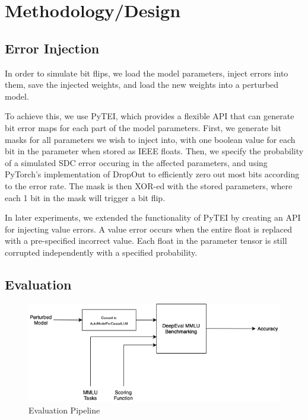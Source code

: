\section{Methodology/Design}
\label{sec:methodology}

\subsection{Error Injection}
In order to simulate bit flips, we load the model parameters, inject errors into them, save the injected weights,
and load the new weights into a perturbed model. 

To achieve this, we use PyTEI, which provides a flexible API that can generate bit error maps for each part of the model parameters. 
First, we generate bit masks for all parameters we wish to inject into, with one boolean value for each bit in the parameter when stored as IEEE floats.
Then, we specify the probability of a simulated SDC error occuring in the affected parameters, and using PyTorch's implementation of DropOut to efficiently
zero out most bits according to the error rate. The mask is then XOR-ed with the stored parameters, where each 1 bit in the mask will trigger a bit flip.

In later experiments, we extended the functionality of PyTEI by creating an API for injecting value errors. A value error occurs when the entire float is replaced with a pre-specified incorrect value. 
Each float in the parameter tensor is still corrupted independently with a specified probability. 

\subsection{Evaluation}
\begin{figure}
    \centering
    \includegraphics[width=1.0\linewidth]{images/evaluation-pipeline.png}
    \caption{Evaluation Pipeline}
    \label{fig:eval-pipeline}
\end{figure}
